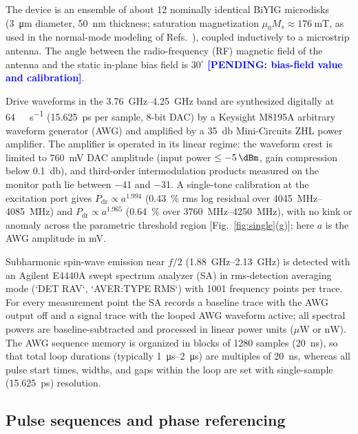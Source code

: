 \documentclass[aps,prb,reprint,superscriptaddress,floatfix]{revtex4-2}
\newcommand{\pend}[1]{\textcolor{blue}{\textbf{[PENDING: #1]}}}
\newcommand{\pend}[1]{}
\begin{document}
The device is an ensemble of about 12 nominally identical BiYIG microdisks (\SI{3}{\micro\metre} diameter, \SI{50}{\nano\metre} thickness; saturation magnetization $\mu_0M_s\approx\SI{176}{\milli\tesla}$, as used in the normal-mode modeling of Refs.~\cite{perna22,yemeli25}), coupled inductively to a microstrip antenna. The angle between the radio-frequency (RF) magnetic field of the antenna and the static in-plane bias field is $30^\circ$ \pend{bias-field value and calibration}.

Drive waveforms in the \SIrange{3.76}{4.25}{\giga\hertz} band are synthesized digitally at \SI{64}{\giga\sample\per\second} (\SI{15.625}{\pico\second} per sample, 8-bit DAC) by a Keysight M8195A arbitrary waveform generator (AWG) and amplified by a \SI{35}{\decibel} Mini-Circuits ZHL power amplifier. The amplifier is operated in its linear regime: the waveform crest is limited to \SI{760}{\milli\volt} DAC amplitude (input power $\le\SI{-5}{\dBm}$, gain compression below \SI{0.1}{\decibel}), and third-order intermodulation products measured on the monitor path lie between \SI{-41}{\dBc} and \SI{-31}{\dBc}. A single-tone calibration at the excitation port gives $P_{\mathrm{dr}}\propto a^{1.994}$ (\SI{0.43}{\percent} rms log residual over \SIrange{4045}{4085}{\mega\hertz}) and $P_{\mathrm{dr}}\propto a^{1.965}$ (\SI{0.64}{\percent} over \SIrange{3760}{4250}{\mega\hertz}), with no kink or anomaly across the parametric threshold region [Fig.~\ref{fig:single}(g)]; here $a$ is the AWG amplitude in mV.

Subharmonic spin-wave emission near $f/2$ (\SIrange{1.88}{2.13}{\giga\hertz}) is detected with an Agilent E4440A swept spectrum analyzer (SA) in rms-detection averaging mode (`DET RAV`, `AVER:TYPE RMS`) with 1001 frequency points per trace. For every measurement point the SA records a baseline trace with the AWG output off and a signal trace with the looped AWG waveform active; all spectral powers are baseline-subtracted and processed in linear power units ($\mu\text{W}$ or $\text{nW}$). The AWG sequence memory is organized in blocks of 1280 samples (\SI{20}{\nano\second}), so that total loop durations (typically \SIrange{1}{2}{\micro\second}) are multiples of \SI{20}{\nano\second}, whereas all pulse start times, widths, and gaps within the loop are set with single-sample (\SI{15.625}{\pico\second}) resolution.

\subsection{Pulse sequences and phase referencing}\label{sec:pulses}
\end{document}
